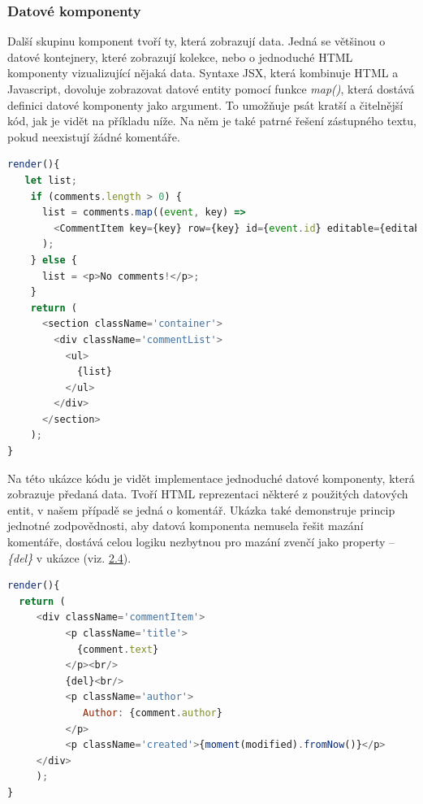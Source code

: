 \subsubsection{Datové komponenty}
Další skupinu komponent tvoří ty, která zobrazují data. Jedná se většinou o datové kontejnery, které zobrazují kolekce, nebo o jednoduché HTML komponenty vizualizující nějaká data. Syntaxe JSX, která kombinuje HTML a Javascript, dovoluje zobrazovat datové entity pomocí funkce \textit{map()}, která dostává definici datové komponenty jako argument. To umožňuje psát kratší a čitelnější kód, jak je vidět na příkladu níže. Na něm je také patrné řešení zástupného textu, pokud neexistují žádné komentáře.
\begin{lstlisting}[language=Javascript,caption={Render metoda datové komponenty CommentList pro zobrazení komentářů}]
render(){
   let list;
    if (comments.length > 0) {
      list = comments.map((event, key) =>
        <CommentItem key={key} row={key} id={event.id} editable={editable} event={event} {...actions} />
      );
    } else {
      list = <p>No comments!</p>;
    }
    return (
      <section className='container'>
        <div className='commentList'>
          <ul>
            {list}
          </ul>
        </div>
      </section>
    );
}
\end{lstlisting}

Na této ukázce kódu je vidět implementace jednoduché datové komponenty, která zobrazuje předaná data. Tvoří HTML reprezentaci některé z použitých datových entit, v našem případě se jedná o komentář. Ukázka také demonstruje princip jednotné zodpovědnosti, aby datová komponenta nemusela řešit mazání komentáře, dostává celou logiku nezbytnou pro mazání zvenčí jako property – \textit{ \{del\}} v ukázce (viz. \hyperref[sec:react_props]{2.4}).
\begin{lstlisting}[language=Javascript,caption={Render metoda komponenty CommentItem reprezentující komentář}]
render(){
  return (
     <div className='commentItem'>
          <p className='title'>
            {comment.text}
          </p><br/>
          {del}<br/>
          <p className='author'>
             Author: {comment.author}
          </p>
          <p className='created'>{moment(modified).fromNow()}</p>
     </div>
     );
}
\end{lstlisting}


